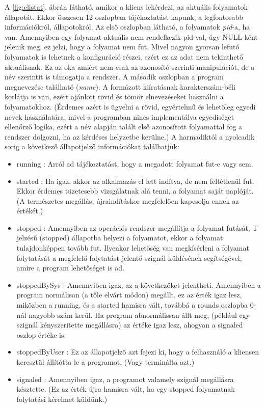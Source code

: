 \documentclass[12pt]{report}
\begin{document}
  A \ref{fig:clistat}. ábrán látható, amikor a kliens lekérdezi, az aktuális folyamatok állapotát. Ekkor összesen 12 oszlopban tájékoztatást kapunk, a legfontosabb információkról, állapotokról. Az első oszlopban látható, a folyamatok \textit{pid}-a, ha van. Amennyiben egy folyamat aktuális nem rendelkezik pid-val, úgy NULL-ként jelenik meg, ez jelzi, hogy a folyamat nem fut. Mivel nagyon gyorsan lefutó folyamatok is lehetnek a konfiguráció részei, ezért ez az adat nem tekinthető aktuálisnak. Ez az oka amiért nem csak az azonosító szerinti manipulációt, de a név szerintit is támogatja a rendszer.
  A második oszlopban a program megnevezése található (\textit{name}). A formázott kiíratásnak karakterszám-béli korlátja is van, ezért ajánlott rövid és tömör elnevezéseket használni a folyamatokhoz. (Érdemes azért is ügyelni a rövid, egyértelmű és lehetőleg egyedi nevek használatára, mivel a programban nincs implementálva egyediséget ellenőrző logika, ezért a név alapján talált első azonosított folyamattal fog a rendszer dolgozni, ha az kérdéses helyzetbe kerülne.)
  A harmadiktól a nyolcadik sorig a következő állapotjelző információkat találhatjuk:
  \begin{itemize}
  \item running : Arról ad tájékoztatást, hogy a megadott folyamat fut-e vagy sem. 
  \item started : Ha igaz, akkor az alkalmazás el lett indítva, de nem feltétlenül fut. Ekkor érdemes tüzetesebb vizsgálatnak alá tenni, a folyamat saját naplóját. (A természetes megállás, újraindításkor megfelelően kapcsolja ennek az értékét.)
  \item stopped : Amennyiben az operációs rendszer megállítja a folyamat futását, T jelzésű (stopped) állapotba helyezi a folyamatot, ekkor a folyamat tulajdonképpen tovább fut. Ilyenkor lehetőség van megkísérleni a folyamat folytatását a megfelelő folytatást jelentő szignál küldésének segítségével, amire a program lehetőséget is ad.  
  \item stoppedBySys : Amennyiben igaz, az a következőket jelentheti. Amennyiben a program normálisan (a tőle elvárt módon) megállt, ez az érték igaz lesz, miközben a running, és a started hamisra vált, továbbá a rounds oszlopba 0-nál nagyobb szám kerül. Ha program abnormálissan állt meg, (például egy szignál kényszerítette megállásra) az értéke igaz lesz, ahogyan a signaled oszlop értéke is.
  \item stoppedByUser : Ez az állapotjelző azt fejezi ki, hogy a felhasználó a kliensen keresztül állítótta le a programot. (Vagy terminálta azt.)
  \item signaled : Amennyiben igaz, a programot valamely szignál megállásra késztette. (Ez az érték újra hamisra vált, ha egy stopped folyamatnak folytatási kérelmet küldünk.)
  \end{itemize}
\end{document}
